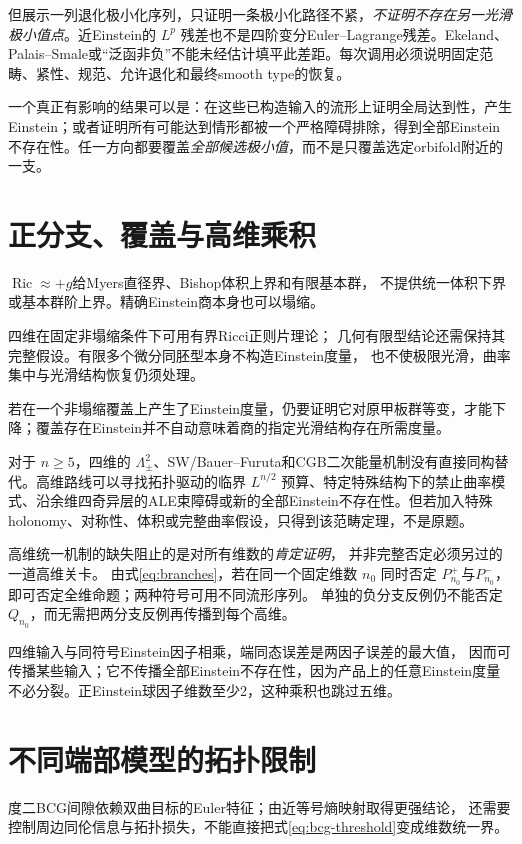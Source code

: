 \documentclass[UTF8,a4paper,11pt,fontset=fandol]{ctexart}
\numberwithin{equation}{section}
\theoremstyle{definition}
\newcommand{\Ric}{\operatorname{Ric}}
\begin{document}
但展示一列退化极小化序列，只证明一条极小化路径不紧，\emph{不证明不存在另一光滑极小值点}。近Einstein的 $L^p$ 残差也不是四阶变分Euler--Lagrange残差。Ekeland、Palais--Smale或“泛函非负”不能未经估计填平此差距。每次调用必须说明固定范畴、紧性、规范、允许退化和最终smooth type的恢复。

一个真正有影响的结果可以是：在这些已构造输入的流形上证明全局达到性，产生Einstein；或者证明所有可能达到情形都被一个严格障碍排除，得到全部Einstein不存在性。任一方向都要覆盖\emph{全部候选极小值}，而不是只覆盖选定orbifold附近的一支。

\section{正分支、覆盖与高维乘积}
$\Ric\approx+g$给Myers直径界、Bishop体积上界和有限基本群，
不提供统一体积下界或基本群阶上界。精确Einstein商本身也可以塌缩。

四维在固定非塌缩条件下可用有界Ricci正则片理论\cite{CN}；
几何有限型结论还需保持其完整假设。有限多个微分同胚型本身不构造Einstein度量，
也不使极限光滑，曲率集中与光滑结构恢复仍须处理。

若在一个非塌缩覆盖上产生了Einstein度量，仍要证明它对原甲板群等变，才能下降；覆盖存在Einstein并不自动意味着商的指定光滑结构存在所需度量。

对于 $n\ge5$，四维的 $\Lambda^2_\pm$、SW/Bauer--Furuta和CGB二次能量机制没有直接同构替代。高维路线可以寻找拓扑驱动的临界 $L^{n/2}$ 预算、特定特殊结构下的禁止曲率模式、沿余维四奇异层的ALE束障碍或新的全部Einstein不存在性。但若加入特殊holonomy、对称性、体积或完整曲率假设，只得到该范畴定理，不是原题。

高维统一机制的缺失阻止的是对所有维数的\emph{肯定证明}，
并非完整否定必须另过的一道高维关卡。
由式\eqref{eq:branches}，若在同一个固定维数 $n_0$ 同时否定
$P_{n_0}^+$与$P_{n_0}^-$，即可否定全维命题；两种符号可用不同流形序列。
单独的负分支反例仍不能否定 $Q_{n_0}$，而无需把两分支反例再传播到每个高维。

四维输入与同符号Einstein因子相乘，端同态误差是两因子误差的最大值，
因而可传播某些输入；它不传播全部Einstein不存在性，因为产品上的任意Einstein度量
不必分裂。正Einstein球因子维数至少2，这种乘积也跳过五维。


\section{不同端部模型的拓扑限制}
度二BCG间隙依赖双曲目标的Euler特征；由近等号熵映射取得更强结论，
还需要控制周边同伦信息与拓扑损失，不能直接把式\eqref{eq:bcg-threshold}变成维数统一界。
\end{document}
